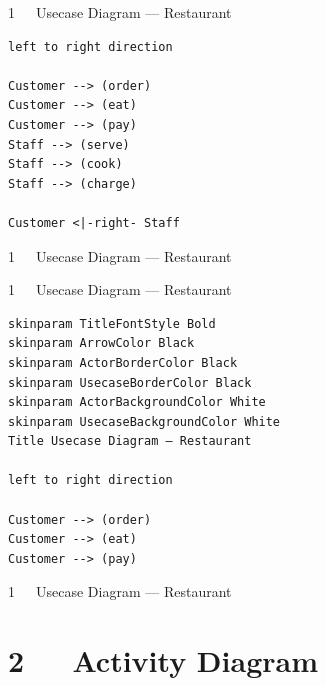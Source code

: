 \documentclass{beamer}
\begin{document}
\begin{frame}[fragile]{1~~~Usecase Diagram — Restaurant}
\begin{verbatim}
left to right direction

Customer --> (order)
Customer --> (eat)
Customer --> (pay)
Staff --> (serve)
Staff --> (cook)
Staff --> (charge)

Customer <|-right- Staff
\end{verbatim}
\end{frame}

\begin{frame}{1~~~Usecase Diagram — Restaurant}
\begin{figure}
\def\centering\svgwidth{\textwidth}
\resizebox{!}{.7\textheight}{}
\end{figure}
\end{frame}

\begin{frame}[fragile]{1~~~Usecase Diagram — Restaurant}
\begin{verbatim}
skinparam TitleFontStyle Bold
skinparam ArrowColor Black
skinparam ActorBorderColor Black
skinparam UsecaseBorderColor Black
skinparam ActorBackgroundColor White
skinparam UsecaseBackgroundColor White
Title Usecase Diagram — Restaurant

left to right direction

Customer --> (order)
Customer --> (eat)
Customer --> (pay)
\end{verbatim}
\end{frame}

\begin{frame}{1~~~Usecase Diagram — Restaurant}
\begin{figure}
\def\centering\svgwidth{\textwidth}
\resizebox{.8\textwidth}{!}{}
\end{figure} 
\end{frame}



\section{2~~~Activity Diagram}
\end{document}
